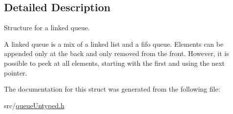 \subsection{Detailed Description}
Structure for a linked queue. 

A linked queue is a mix of a linked list and a fifo queue. Elements can be appended only at the back and only removed from the front. However, it is possible to peek at all elements, starting with the first and using the next pointer. 

The documentation for this struct was generated from the following file\-:\begin{DoxyCompactItemize}
\item 
src/\hyperlink{queueUntyped_8h}{queue\-Untyped.\-h}\end{DoxyCompactItemize}
